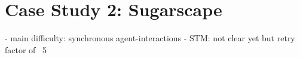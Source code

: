 \section{Case Study 2: Sugarscape}
- main difficulty: synchronous agent-interactions
- STM: not clear yet but retry factor of ~5
